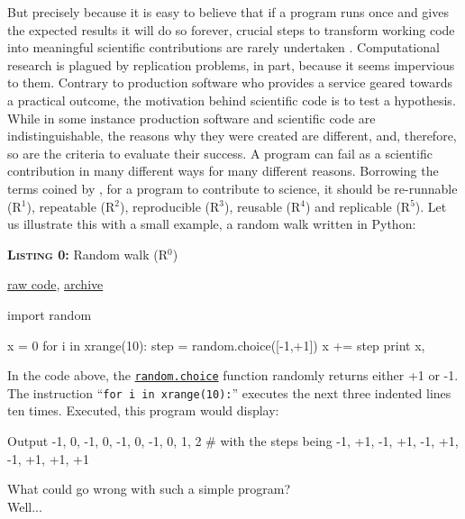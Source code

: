 \documentclass[a4paper,11pt]{article}
\begin{document}
But precisely because it is easy to believe that if a program runs once and
gives the expected results it will do so forever, crucial steps to transform
working code into meaningful scientific contributions are rarely undertaken
\citep{Collberg:2016,Sandve:2013,Schwab:2000}. Computational research is plagued by replication
problems, in part, because it seems impervious to them. Contrary to production software who provides a service geared towards a practical outcome, the motivation behind scientific code is to test a hypothesis. While in some instance production software and scientific code are indistinguishable, the reasons why they were created are different, and, therefore, so are the criteria to evaluate their success. A program can
fail as a scientific contribution in many different ways for many different
reasons. Borrowing the terms coined by \citeauthor{Goble:2016}
\citep{Goble:2016}, for a program to contribute to science, it should be
re-runnable (R$^1$), repeatable (R$^2$), reproducible (R$^3$),
reusable (R$^4$) and replicable (R$^5$). Let us illustrate this with a small
example, a random walk \citep{Hughes:1995} written in Python:\\

\noindent \begin{minipage}[c]{\linewidth}
\begin{code}{\parbox{.8\textwidth}{\textbf{\textsc{Listing 0:}} Random walk (R$^0$)}\parbox{.161\textwidth}{\hfill \href{https://raw.githubusercontent.com/rougier/random-walk/frontiers/random-walk-R0.py}{raw code}, \href{https://doi.org/10.5281/zenodo.848217}{archive}}}
import random

x = 0
for i in xrange(10):
    step = random.choice([-1,+1])
    x += step
    print x,
\end{code}
\end{minipage}

\vspace{1.5em}

In the code above, the {\tt \href{https://docs.python.org/3.6/library/random.html#random.choice}{random.choice}} function randomly returns either +1 or -1. The instruction \enquote{\tt for i in xrange(10):}  executes the next three indented lines ten times. Executed, this program would display:
\begin{code}{Output}
-1, 0, -1, 0, -1, 0, -1, 0, 1, 2 # with the steps being -1, +1, -1, +1, -1, +1, -1, +1, +1, +1
\end{code}

What could go wrong with such a simple program?\\
\vfill
Well...
\vfill
\end{document}
